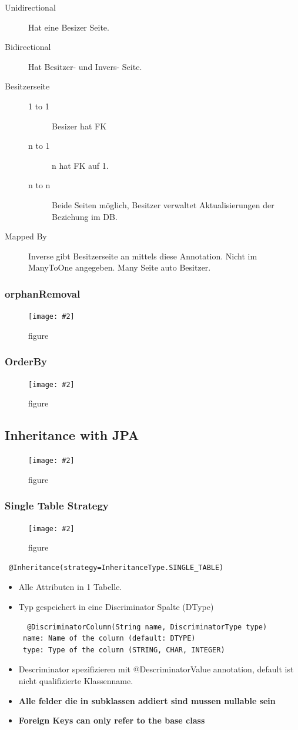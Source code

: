 \documentclass[a4paper,10pt]{scrreprt}
\newcommand{\pic}[2][figure]{\begin{figure}[h]
 \centering
 \texttt{[image: \#2]}
 \caption{#1}
\end{figure}
}
\begin{document}
\begin{description}
 \item [Unidirectional] Hat eine Besizer Seite.
 \item [Bidirectional] Hat Besitzer- und Invers- Seite.
 \item [Besitzerseite] \begin{description}
                        \item [1 to 1] Besizer hat FK
                        \item [n to 1] n hat FK auf 1.
                        \item [n to n] Beide Seiten möglich, Besitzer verwaltet Aktualisierungen der Beziehung im DB.
                       \end{description}
\item[Mapped By] Inverse gibt Besitzerseite an mittels diese Annotation. Nicht im ManyToOne angegeben. Many Seite auto Besitzer.
\end{description}

\subsubsection{orphanRemoval}
\pic{orphrem.png}

\subsubsection{OrderBy}
\pic{ordby.png}

\subsection{Inheritance with JPA}

\pic{jpa_inh.png}

\subsubsection{Single Table Strategy}
\pic{sts.png}
\begin{lstlisting}
 @Inheritance(strategy=InheritanceType.SINGLE_TABLE)
\end{lstlisting}
\begin{itemize}
 \item Alle Attributen in 1 Tabelle.
 \item Typ gespeichert in eine Discriminator Spalte (DType)
 \begin{verbatim}
  @DiscriminatorColumn(String name, DiscriminatorType type)
 name: Name of the column (default: DTYPE)
 type: Type of the column (STRING, CHAR, INTEGER)
 \end{verbatim}
\item Descriminator spezifizieren mit @DescriminatorValue annotation, default ist nicht qualifizierte Klassenname.
\item \textbf{Alle felder die in subklassen addiert sind mussen nullable sein}
\item \textbf{Foreign Keys can only refer to the base class}
\end{itemize}
\end{document}

